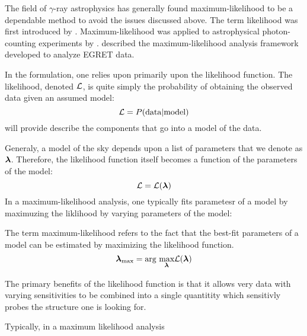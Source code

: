 
The field of $\gamma$-ray astrophysics has generally
found maximum-likelihood to be a dependable method to
avoid the issues discussed above.  The term likelihood was
first introduced by \cite{fisher_1925_statistical-methods}.
Maximum-likelihood was applied to astrophysical photon-counting
experiments by \cite{cash_1979_parameter-estimation}.
\cite{mattox_1996_likelihood-analysis} described the maximum-likelihood
analysis framework developed to analyze \ac{EGRET} data.

In the formulation, one relies upon primarily upon the likelihood
function.  The likelihood, denoted $\mathcal{L}$, is quite simply the
probability of obtaining the observed data given an assumed model:
\begin{equation}
  \mathcal{L} = P(\text{data}|\text{model})
\end{equation}
 will provide describe the
components that go into a model of the data.

Generaly, a model of the sky depends upon a list
of parameters that we denote as $\boldsymbol{\lambda}$.
Therefore, the likelihood function itself becomes
a function of the parameters of the model:
\begin{equation}
  \mathcal{L} = \mathcal{L}(\boldsymbol{\lambda})
\end{equation}
In a maximum-likelihood analysis, one typically
fits parametesr of a model by maximuzing the liklihood
by varying parameters of the model:

The term maximum-likelihood refers to the fact that
the best-fit parameters of a model can be estimated
by maximizing the likelihood function.
\begin{equation}
\boldsymbol{\lambda}_\text{max} = \underset{}{\text{arg }}\underset{\boldsymbol{\lambda}}{\text{max}} \mathcal{L}(\boldsymbol{\lambda})
\end{equation}

The primary benefits of the likelihood function is that it allows
very data with varying sensitivities to be combined into
a single quantitity which sensitivly probes the structure one is looking for.

Typically, in a maximum likelihood analysis

